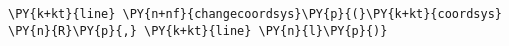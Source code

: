 \begin{Verbatim}[commandchars=\\\{\}]
    \PY{k+kt}{line} \PY{n+nf}{changecoordsys}\PY{p}{(}\PY{k+kt}{coordsys} \PY{n}{R}\PY{p}{,} \PY{k+kt}{line} \PY{n}{l}\PY{p}{)}
\end{Verbatim}
